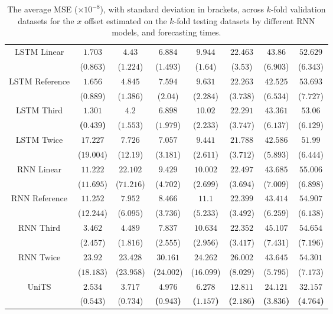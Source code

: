 \begin{table}[!ht]
{\begin{tabular}{|c|c|c|c|c|c|c|c|}
			\multirow{2}{*}{LSTM Linear} & $1.703$ & $4.43$ & $6.884$ & $9.944$ & $22.463$ & $43.86$ & $52.629$ \\
			 & ($0.863$) & ($1.224$) & ($1.493$) & ($1.64$) & ($3.53$) & ($6.903$) & ($6.343$) \\ \hline
			\multirow{2}{*}{LSTM Reference} & $1.656$ & $4.845$ & $7.594$ & $9.631$ & $22.263$ & $42.525$ & $53.693$ \\
			 & ($0.889$) & ($1.386$) & ($2.04$) & ($2.284$) & ($3.738$) & ($6.534$) & ($7.727$) \\ \hline
			\multirow{2}{*}{LSTM Third} & $\mathbf{1.301}$ & $4.2$ & $6.898$ & $10.02$ & $22.291$ & $43.361$ & $53.06$ \\
			 & \textbf{(}$\mathbf{0.439}$\textbf{)} & ($1.553$) & ($1.979$) & ($2.233$) & ($3.747$) & ($6.137$) & ($6.129$) \\ \hline
			\multirow{2}{*}{LSTM Twice} & $17.227$ & $7.726$ & $7.057$ & $9.441$ & $21.788$ & $42.586$ & $51.99$ \\
			 & ($19.004$) & ($12.19$) & ($3.181$) & ($2.611$) & ($3.712$) & ($5.893$) & ($6.444$) \\ \hline
			\multirow{2}{*}{RNN Linear} & $11.222$ & $22.102$ & $9.429$ & $10.002$ & $22.497$ & $43.685$ & $55.006$ \\
			 & ($11.695$) & ($71.216$) & ($4.702$) & ($2.699$) & ($3.694$) & ($7.009$) & ($6.898$) \\ \hline
			\multirow{2}{*}{RNN Reference} & $11.252$ & $7.952$ & $8.466$ & $11.1$ & $22.399$ & $43.414$ & $54.907$ \\
			 & ($12.244$) & ($6.095$) & ($3.736$) & ($5.233$) & ($3.492$) & ($6.259$) & ($6.138$) \\ \hline
			\multirow{2}{*}{RNN Third} & $3.462$ & $4.489$ & $7.837$ & $10.634$ & $22.352$ & $45.107$ & $54.654$ \\
			 & ($2.457$) & ($1.816$) & ($2.555$) & ($2.956$) & ($3.417$) & ($7.431$) & ($7.196$) \\ \hline
			\multirow{2}{*}{RNN Twice} & $23.92$ & $23.428$ & $30.161$ & $24.262$ & $26.002$ & $43.645$ & $54.301$ \\
			 & ($18.183$) & ($23.958$) & ($24.002$) & ($16.099$) & ($8.029$) & ($5.795$) & ($7.173$) \\ \hline
			\multirow{2}{*}{UniTS} & $2.534$ & $3.717$ & $\mathbf{4.976}$ & $\mathbf{6.278}$ & $\mathbf{12.811}$ & $\mathbf{24.121}$ & $\mathbf{32.157}$ \\
			 & ($0.543$) & ($0.734$) & \textbf{(}$\mathbf{0.943}$\textbf{)} & \textbf{(}$\mathbf{1.157}$\textbf{)} & \textbf{(}$\mathbf{2.186}$\textbf{)} & \textbf{(}$\mathbf{3.836}$\textbf{)} & \textbf{(}$\mathbf{4.764}$\textbf{)} \\ \hline
		\end{tabular}
	}
	\caption{The average MSE ($\times 10^{-8}$), with standard deviation in brackets, across $k$-fold validation datasets for the $x$ offset estimated on the $k$-fold testing datasets by different RNN models, and forecasting times.}
	\label{tab:all_longitude_no_abs_MSE}
\end{table}